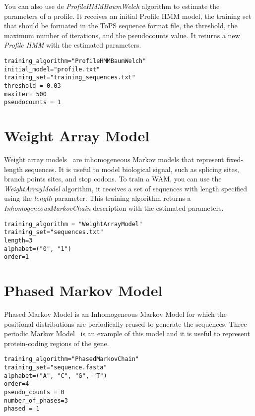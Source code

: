 You can also use de \textit{ProfileHMMBaumWelch} algorithm to estimate the parameters of a profile. It receives an initial Profile HMM model, the training set that should be formated in the ToPS sequence format file, the threshold, the maximum number of iterations, and the pseudocounts value.
It returns a new \textit{Profile HMM} with the estimated parameters.

\begin{Verbatim}[frame=single,label=train.txt]
training_algorithm="ProfileHMMBaumWelch"
initial_model="profile.txt"
training_set="training_sequences.txt"
threshold = 0.03
maxiter= 500
pseudocounts = 1
\end{Verbatim}


\section{Weight Array Model}

Weight array models~\cite{Burge1997,Zhang1993} are inhomogeneous Markov models that represent fixed-length sequences. It is useful to model biological signal, such as splicing sites,  branch points sites, and stop codons. To train a WAM, you can use the \textit{WeightArrayModel} algorithm, it receives a set of sequences with length specified using the \textit{length} parameter. This training algorithm returns a \textit{InhomogeneousMarkovChain} description with the estimated parameters.

\begin{Verbatim}[frame=single,label=train.txt]
training_algorithm = "WeightArrayModel"
training_set="sequences.txt"
length=3
alphabet=("0", "1")
order=1
\end{Verbatim}

\section{Phased Markov Model}

Phased Markov Model is an Inhomogeneous Markov Model for which the positional distributions are periodically reused to generate the sequences. 
Three-periodic Markov Model~\cite{Borodovsky1993}  is an example of this model and it is useful to represent protein-coding regions of the gene. 

\begin{Verbatim}[frame=single, label=train.txt]
training_algorithm="PhasedMarkovChain"
training_set="sequence.fasta"
alphabet=("A", "C", "G", "T")
order=4
pseudo_counts = 0
number_of_phases=3
phased = 1
\end{Verbatim}

